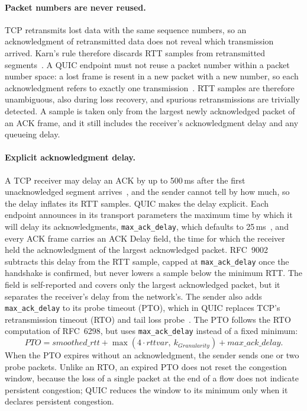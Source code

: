 \paragraph{Packet numbers are never reused.} TCP retransmits lost data with the same
sequence numbers, so an acknowledgment of retransmitted data does not reveal which
transmission arrived. Karn's rule therefore discards RTT samples from retransmitted
segments~\cite{karn1987improving}. A QUIC endpoint must not reuse a packet number
within a packet number space: a lost frame is resent in a new packet
with a new number, so each acknowledgment refers to exactly one
transmission~\cite{rfc9002}. RTT samples are therefore unambiguous, also during loss
recovery, and spurious retransmissions are trivially detected.
A sample is taken only from the largest
newly acknowledged packet of an ACK frame, and it still includes the receiver's
acknowledgment delay and any queueing delay.

\paragraph{Explicit acknowledgment delay.} A TCP receiver may delay an ACK by up to
500\,ms after the first unacknowledged segment arrives~\cite{rfc5681}, and the sender cannot tell by
how much, so the delay inflates its RTT samples. QUIC makes the delay explicit. Each
endpoint announces in its transport parameters the maximum time by which it will
delay its acknowledgments, \texttt{max\_ack\_delay}, which defaults to 25\,ms~\cite{rfc9000}, and
every ACK frame carries an ACK Delay field, the time for which the receiver held the
acknowledgment of the largest acknowledged packet. RFC~9002 subtracts this delay from
the RTT sample, capped at \texttt{max\_ack\_delay} once the handshake is confirmed,
but never lowers a sample below the minimum RTT. The field is self-reported and
covers only the largest acknowledged packet, but it separates the receiver's delay
from the network's. The sender also adds \texttt{max\_ack\_delay} to its probe timeout
(PTO), which in QUIC replaces TCP's retransmission timeout (RTO) and tail loss probe~\cite{rfc9002}.
The PTO follows the RTO computation of RFC~6298, but uses \texttt{max\_ack\_delay}
instead of a fixed minimum:
\begin{equation}
  \mathit{PTO} = \mathit{smoothed\_rtt} + \max(4 \cdot \mathit{rttvar},\
  k_{\mathit{Granularity}}) + \mathit{max\_ack\_delay}.
  \label{eq:bg-pto}
\end{equation}
When the PTO expires without an acknowledgment, the sender sends one or two probe
packets. Unlike an RTO, an expired PTO does not reset the congestion window, because
the loss of a single packet at the end of a flow does not indicate persistent
congestion; QUIC reduces the window to its minimum only when it declares persistent
congestion.

